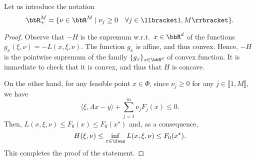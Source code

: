  Let us introduce the notation
 \begin{equation}
     \bbR^M_+=\{\nu\in \bbR^M\mid \nu_j\ge 0\quad \forall j\in \llbracket 1,M\rrbracket\}.
 \end{equation}
 
 
 
 \begin{proof}
     Observe that $-H$ is the supremum w.r.t.~$x\in \bbR^d$ of the functions $g_x(\xi,\nu) = -L(x,\xi,\nu)$. The function $g_x$ is affine, and thus convex. Hence, $-H$ is the pointwise supremum of the family $\{g_x\}_{x\in\bbR^d}$ of convex function. It is immediate to check that it is convex, and thus that $H$ is concave.
 
     On the other hand, for any feasible point $x\in \Phi$, since $\nu_j\ge 0$ for any $j\in \llbracket1,M\rrbracket$, we have
     \begin{equation}
         \langle \xi, Ax-y\rangle +\sum_{j=1}^m \nu_j F_j(x) \le 0.
     \end{equation}
     Then, $L(x,\xi,\nu)\le F_0(x)\le F_0(x^\star)$ and, as a consequence,
     \begin{equation}
         H(\xi,\nu) \le \inf_{x\in\feas} L(x,\xi,\nu) \le F_0(x^\star).
     \end{equation}
     This completes the proof of the statement.
 \end{proof}
 
